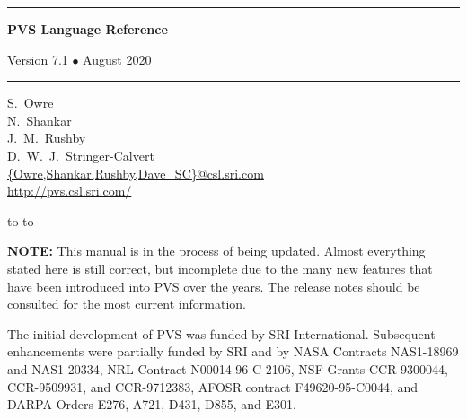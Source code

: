 \documentclass[12pt]{book}
\begin{document}
\begin{titlepage}
\renewcommand{\thepage}{title}
\vspace*{1in}
\noindent
\rule[1pt]{\textwidth}{2pt}
\begin{center}
\textbf{\pvstitle PVS Language Reference}
\end{center}
\begin{flushright}
{\Large Version 7.1 {\smaller$\bullet$} August 2020}
\end{flushright}
\rule[1in]{\textwidth}{2pt}
\vspace*{2in}
\begin{flushleft}
S.~Owre\\
N.~Shankar\\
J.~M.~Rushby\\
D.~W.~J.~Stringer-Calvert\\
{\smaller\url{{Owre,Shankar,Rushby,Dave_SC}@csl.sri.com}}\\
{\smaller\url{http://pvs.csl.sri.com/}}
\end{flushleft}
\vspace*{1in}
\vbox{\hbox to %
\hbox to }
\end{titlepage}

\renewcommand{\chaptermark}[1]{\markboth{{\em #1}}{}\markright{{\em #1}}}
\renewcommand{\sectionmark}[1]{\markright{\thesection \em \ #1}}
\thispagestyle{empty}

\newpage
\renewcommand{\thepage}{ack}

\noindent\textbf{NOTE:} This manual is in the process of being updated.
Almost everything stated here is still correct, but incomplete due to the
many new features that have been introduced into PVS over the years.  The
release notes should be consulted for the most current information.

\vspace*{6in}\noindent
The initial development of PVS was funded by SRI International.
Subsequent enhancements were partially funded by SRI and by NASA
Contracts NAS1-18969 and NAS1-20334, NRL Contract N00014-96-C-2106,
NSF Grants CCR-9300044, CCR-9509931, and CCR-9712383, AFOSR contract
F49620-95-C0044, and DARPA Orders E276, A721, D431, D855, and E301.
\newpage
{}
\setcounter{page}{1}
\end{document}
